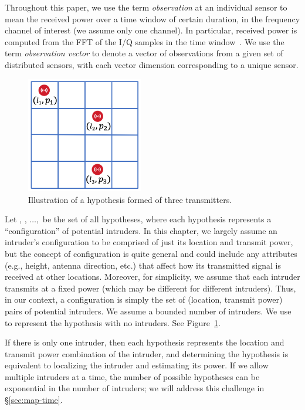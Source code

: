  Throughout this
paper, we use the term {\em observation} at an individual sensor to
mean the received power over a time window of certain duration, in the
frequency channel of interest (we assume only one channel). In
particular, received power is computed from the FFT of the I/Q samples
in the time window~\cite{arani2018}. We use the term {\em observation
  vector} \vx to denote a vector of observations from a given set of
distributed sensors, with each vector dimension corresponding to a
unique sensor.

\begin{figure}
\includegraphics[width=2in]{chapters/ipsn/figures/hypothesis.png}
\caption{Illustration of a hypothesis formed of three transmitters.}
\label{fig:hypothesis-grid}
\end{figure}
 Let \hz, \ho, $\ldots,$ \hM be the set of all
hypotheses, where each hypothesis \hj represents a ``configuration''
of potential intruders. In this chapter, we largely assume an
  intruder's configuration to be comprised of just its location and
  transmit power, but the concept of configuration is quite general
  and could include any attributes (e.g., height, antenna direction,
  etc.) that affect how its transmitted signal is received at other
  locations. Moreover, for simplicity, we assume that each intruder
  transmits at a fixed power (which may be different for different
  intruders). Thus, in our context, a configuration is simply the set
of (location, transmit power) pairs of potential intruders. We
assume a bounded number of intruders. We use \hz to represent the
hypothesis with no intruders. See Figure~\ref{fig:hypothesis-grid}.

If there is only one intruder, then each hypothesis represents the
location and transmit power combination of the intruder, and
determining the hypothesis is equivalent to localizing the intruder
and estimating its power. If we allow multiple intruders at a time,
the number of possible hypotheses can be exponential in the number of
intruders; we will address this challenge in
\S\ref{sec:map-time}.

